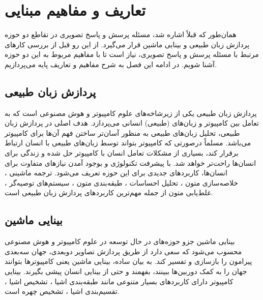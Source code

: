 \chapter{تعاریف و مفاهیم مبنایی}
\thispagestyle{empty}
	همان‌طور که قبلاً اشاره شد، مسئله پرسش و پاسخ تصویری در تقاطع دو حوزه پردازش زبان طبیعی و بینایی ماشین قرار می‌گیرد. از این رو قبل از بررسی کارهای مرتبط با مسئله پرسش و پاسخ تصویری، نیاز است تا با مفاهیم مربوط به این دو حوزه آشنا شویم. در ادامه این فصل به شرح مفاهیم و تعاریف پایه می‌پردازیم.

\section{پردازش زبان طبیعی}
	پردازش زبان‌ طبیعی 
	یکی از زیرشاخه‌های علوم کامپیوتر و هوش مصنوعی است که به تعامل بین کامپیوتر و زبان‌های (طبیعی) انسانی می‌پردازد. هدف اصلی در پردازش زبان طبیعی، تحلیل زبان‌های طبیعی به منظور آسان‌تر ساختن فهم آ‌ن‌ها برای کامپیوتر می‌باشد. مسلماً درصورتی که کامپیوتر بتواند توسط زبان‌های طبیعی با انسان ارتباط برقرار کند، بسیاری از مشکلات تعامل انسان با کامپیوتر حل شده و زندگی برای انسان‌ها راحت‌تر خواهد شد. با پیشرفت تکنولوژی و بوجود آمدن نیازهای متفاوت برای انسان‌ها، کاربردهای جدیدی برای این حوزه تعریف می‌شود. ترجمه ماشینی
	، خلاصه‌سازی متون
	، تحلیل احساسات
	، طبقه‌بندی متون
	، سیستم‌های توصیه‌گر
	، غلط‌یابی متون
	از جمله مهم‌ترین کاربردهای پردازش زبان طبیعی است.
	
\section{بینایی ماشین}
 بینایی ماشین
  جزو حوزه‌های در حال توسعه در علوم کامپیوتر و هوش مصنوعی محسوب می‌شود که سعی دارد از طریق پردازش تصاویر دوبعدی، جهان سه‌بعدی پیرامون را بازسازی و تفسیر کند. به بیان ساده، بینایی ماشین یعنی کامپیوترها بتوانند جهان را به کمک دوربین‌ها ببینند، بفهمند و حتی از بینایی انسان پیشی بگیرند. بینایی کامپیوتر دارای کاربردهای بسیار متنوعی مانند طبقه‌بندی اشیا
  ، تشخیص اشیا
  ، تقسیم‌بندی اشیا
  ، تشخیص چهره
   است.

